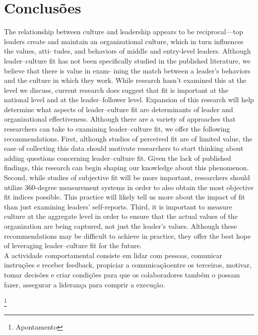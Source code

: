 \section{Conclusões}
The relationship between culture and leadership appears to be reciprocal—top leaders
create and maintain an organizational culture, which in turn influences the values, atti-
tudes, and behaviors of middle and entry-level leaders. Although leader–culture fit has not
been specifically studied in the published literature, we believe that there is value in exam-
ining the match between a leader’s behaviors and the culture in which they work. While
research hasn’t examined this at the level we discuss, current research does suggest that fit
is important at the national level and at the leader–follower level. Expansion of this
research will help determine what aspects of leader–culture fit are determinants of leader
and organizational effectiveness.
Although there are a variety of approaches that researchers can take to examining
leader–culture fit, we offer the following recommendations. First, although studies of
perceived fit are of limited value, the ease of collecting this data should motivate researchers
to start thinking about adding questions concerning leader–culture fit. Given the lack of
published findings, this research can begin shaping our knowledge about this phenomenon.
Second, while studies of subjective fit will be more important, researchers should utilize
360-degree measurement systems in order to also obtain the most objective fit indices
possible. This practice will likely tell us more about the impact of fit than just examining
leaders’ self-reports. Third, it is important to measure culture at the aggregate level in
order to ensure that the actual values of the organization are being captured, not just the
leader’s values. Although these recommendations may be difficult to achieve in practice,
they offer the best hope of leveraging leader–culture fit for the future.\\

A actividade comportamental consiste em lidar com pessoas, comunicar instruções e receber feedback, propiciar a comunicaçãoentre os terceiros, motivar, tomar decisões e criar condições para que os colaboradores também o possam fazer, assegurar a liderança para comprir a execução.\\

\newpage
%
%
%
\listoffigures
\cite{*}

\newpage
\footnote{Apontamento}

